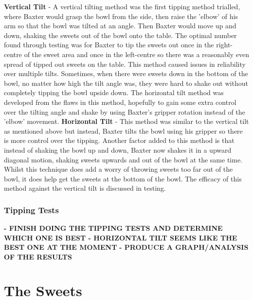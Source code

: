 \newline\newline
\textbf{Vertical Tilt} - 
A vertical tilting method was the first tipping method trialled, where Baxter would grasp the bowl from the side, then raise the 'elbow' of his arm so that the bowl was tilted at an angle. Then Baxter would move up and down, shaking the sweets out of the bowl onto the table. The optimal number found through testing was for Baxter to tip the sweets out once in the right-centre of the sweet area and once in the left-centre so there was a reasonably even spread of tipped out sweets on the table. This method caused issues in reliability over multiple tilts. Sometimes, when there were sweets down in the bottom of the bowl, no matter how high the tilt angle was, they were hard to shake out without completely tipping the bowl upside down. The horizontal tilt method was developed from the flaws in this method, hopefully to gain some extra control over the tilting angle and shake by using Baxter's gripper rotation instead of the 'elbow' movement.
\newline\newline
\textbf{Horizontal Tilt} - This method was similar to the vertical tilt as mentioned above but instead, Baxter tilts the bowl using his gripper so there is more control over the tipping. Another factor added to this method is that instead of shaking the bowl up and down, Baxter now shakes it in a upward diagonal motion, shaking sweets upwards and out of the bowl at the same time. Whilst this technique does add a worry of throwing sweets too far out of the bowl, it does help get the sweets at the bottom of the bowl. The efficacy of this method against the vertical tilt is discussed in testing.
\subsubsection{Tipping Tests}
\textbf{- FINISH DOING THE TIPPING TESTS AND DETERMINE WHICH ONE IS BEST - HORIZONTAL TILT SEEMS LIKE THE BEST ONE AT THE MOMENT}\newline\newline
\textbf{- PRODUCE A GRAPH/ANALYSIS OF THE RESULTS}
\label{sssec:TippingTest}
\section{The Sweets}
